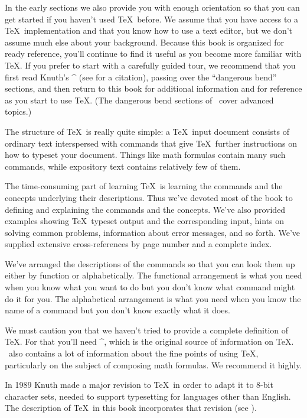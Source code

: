 In the early sections we also provide you with enough orientation so
that you can get started if you haven't used \TeX\ before.  We assume
that you have access to a \TeX\ implementation and that you know how to
use a text editor, but we don't assume much else about your background.
Because this book is organized for ready reference, you'll continue to
find it useful as you become more familiar with \TeX.  If you prefer to
start with a carefully guided tour, we recommend that you first read
Knuth's ^{\texbook} (see  for a citation), passing
over the ``dangerous bend'' sections, and then return to this book for
additional information and for reference as you start to use \TeX.  (The
dangerous bend sections of \texbook\ cover advanced topics.)

The structure of \TeX\ is really quite simple: a \TeX\ input document
consists of ordinary text interspersed with commands that give \TeX\
further instructions on how to typeset your document.  Things like math
formulas contain many such commands, while expository text contains
relatively few of them.

The time-consuming part of learning \TeX\ is learning the commands and
the concepts underlying their descriptions.  Thus we've devoted most of
the book to defining and explaining the commands and the concepts.
We've also provided examples showing \TeX\ typeset output and the
corresponding input, hints on solving common problems, information about
error messages, and so forth.  We've supplied extensive cross-references
by page number and a complete index.

We've arranged the descriptions of the commands so that you can look
them up either by function or alphabetically.  The functional
arrangement is what you need when you know what you want to do but you
don't know what command might do it for you.  The alphabetical arrangement
is what you need when you know the name of a command but you don't know exactly
what it does.

We must caution you that we haven't tried to provide a complete
definition of \TeX.  For that you'll need ^{\texbook}, which is the
original source of information on \TeX.  \texbook\ also contains a lot
of information about the fine points of using \TeX, particularly on the
subject of composing math formulas.  We recommend it highly.

In 1989 Knuth made a major revision to \TeX\ in order to adapt it to
$8$-bit character sets, needed to support typesetting for languages
other than English.  The description of \TeX\ in this book incorporates
that revision (see \xref{newtex}).

